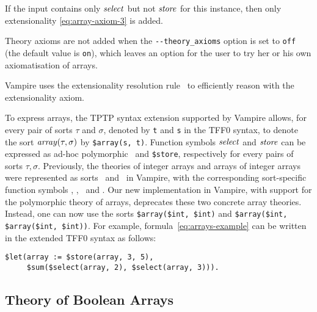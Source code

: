 If the input contains only $\mathit{select}$ but not $\mathit{store}$ for this instance, then only extensionality \eqref{eq:array-axiom-3} is added.

Theory axioms are not added when the \verb'--theory_axioms' option is set to \verb'off' (the default value is \verb'on'), which leaves an option for the user to try her or his own axiomatisation of arrays.

Vampire uses the extensionality resolution rule~\cite{ATVA14} to efficiently reason with the extensionality axiom.

To express arrays, the TPTP syntax extension supported by Vampire
allows, for every pair of sorts $\tau$ and $\sigma$, denoted by
\lstinline't' and \lstinline's' in the TFF0 syntax, to denote the sort
$\mathit{array}(\tau,\sigma)$ by \lstinline'$array(s, t)'. Function symbols $\mathit{select}$
and $\mathit{store}$ can be expressed as ad-hoc polymorphic \dselect\ and
\texttt{\$store}, respectively for every pairs of sorts
$\tau,\sigma$. Previously,
the theories of integer arrays and arrays of integer arrays were
represented as sorts \darrayone\ and \darraytwo\ in Vampire,
with the corresponding sort-specific function symbols \dselectone, \dselecttwo, \dstoreone\  and
\dstoretwo. Our new implementation in Vampire, with
support for the polymorphic theory of arrays, deprecates these
two concrete array theories. Instead, one can now use the sorts
\lstinline'$array($int, $int)' and \lstinline'$array($int, $array($int, $int))'.
For example, formula~\eqref{eq:arrays-example} can be written in the extended TFF0 syntax as follows:
\begin{lstlisting}
$let(array := $store(array, 3, 5),
     $sum($select(array, 2), $select(array, 3))).
\end{lstlisting}%

\subsection{Theory of Boolean Arrays}

